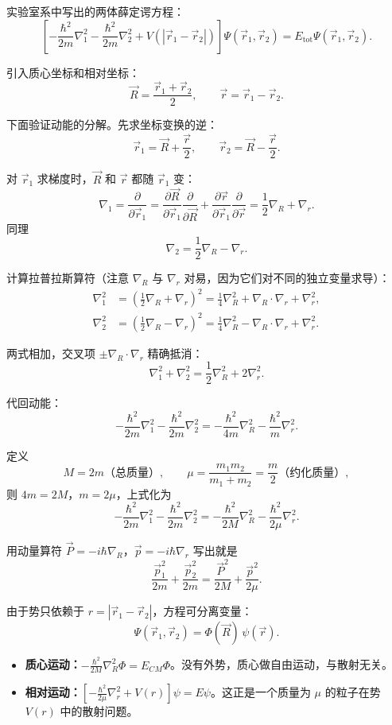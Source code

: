 \begin{derivationbox}
实验室系中写出的两体薛定谔方程：
\[
\left[ -\frac{\hbar^2}{2m}\nabla_1^2 - \frac{\hbar^2}{2m}\nabla_2^2 + V(|\vec{r}_1 - \vec{r}_2|) \right] \Psi(\vec{r}_1, \vec{r}_2) = E_{\text{tot}} \Psi(\vec{r}_1, \vec{r}_2).
\]

引入质心坐标和相对坐标：
\[
\vec{R} = \frac{\vec{r}_1 + \vec{r}_2}{2}, \qquad \vec{r} = \vec{r}_1 - \vec{r}_2.
\]

下面验证动能的分解。先求坐标变换的逆：
\[
\vec{r}_1 = \vec{R} + \frac{\vec{r}}{2}, \qquad \vec{r}_2 = \vec{R} - \frac{\vec{r}}{2}.
\]

对 $\vec{r}_1$ 求梯度时，$\vec{R}$ 和 $\vec{r}$ 都随 $\vec{r}_1$ 变：
\[
\nabla_1 = \frac{\partial}{\partial \vec{r}_1} = \frac{\partial \vec{R}}{\partial \vec{r}_1} \frac{\partial}{\partial \vec{R}} + \frac{\partial \vec{r}}{\partial \vec{r}_1} \frac{\partial}{\partial \vec{r}} = \frac{1}{2}\nabla_R + \nabla_r.
\]
同理
\[
\nabla_2 = \frac{1}{2}\nabla_R - \nabla_r.
\]

计算拉普拉斯算符（注意 $\nabla_R$ 与 $\nabla_r$ 对易，因为它们对不同的独立变量求导）：
\begin{align*}
\nabla_1^2 &= \left( \frac{1}{2}\nabla_R + \nabla_r \right)^2 = \frac{1}{4}\nabla_R^2 + \nabla_R \cdot \nabla_r + \nabla_r^2, \\
\nabla_2^2 &= \left( \frac{1}{2}\nabla_R - \nabla_r \right)^2 = \frac{1}{4}\nabla_R^2 - \nabla_R \cdot \nabla_r + \nabla_r^2.
\end{align*}

两式相加，交叉项 $\pm \nabla_R \cdot \nabla_r$ 精确抵消：
\[
\nabla_1^2 + \nabla_2^2 = \frac{1}{2}\nabla_R^2 + 2\nabla_r^2.
\]

代回动能：
\[
-\frac{\hbar^2}{2m}\nabla_1^2 - \frac{\hbar^2}{2m}\nabla_2^2 = -\frac{\hbar^2}{4m}\nabla_R^2 - \frac{\hbar^2}{m}\nabla_r^2.
\]

定义
\[
M = 2m \text{（总质量）}, \qquad \mu = \frac{m_1 m_2}{m_1 + m_2} = \frac{m}{2} \text{（约化质量）},
\]
则 $4m = 2M$，$m = 2\mu$，上式化为
\[
-\frac{\hbar^2}{2m}\nabla_1^2 - \frac{\hbar^2}{2m}\nabla_2^2 = -\frac{\hbar^2}{2M}\nabla_R^2 - \frac{\hbar^2}{2\mu}\nabla_r^2.
\]

用动量算符 $\vec{P} = -i\hbar\nabla_R$，$\vec{p} = -i\hbar\nabla_r$ 写出就是
\[
\frac{\vec{p}_1^2}{2m} + \frac{\vec{p}_2^2}{2m} = \frac{\vec{P}^2}{2M} + \frac{\vec{p}^2}{2\mu}.
\]

由于势只依赖于 $r = |\vec{r}_1 - \vec{r}_2|$，方程可分离变量：
\[
\Psi(\vec{r}_1, \vec{r}_2) = \Phi(\vec{R}) \, \psi(\vec{r}).
\]
\begin{itemize}
    \item \textbf{质心运动：}$-\frac{\hbar^2}{2M}\nabla_R^2 \Phi = E_{CM} \Phi$。没有外势，质心做自由运动，与散射无关。
    \item \textbf{相对运动：}$\left[ -\frac{\hbar^2}{2\mu}\nabla_r^2 + V(r) \right] \psi = E\psi$。这正是一个质量为 $\mu$ 的粒子在势 $V(r)$ 中的散射问题。
\end{itemize}


\end{derivationbox}
